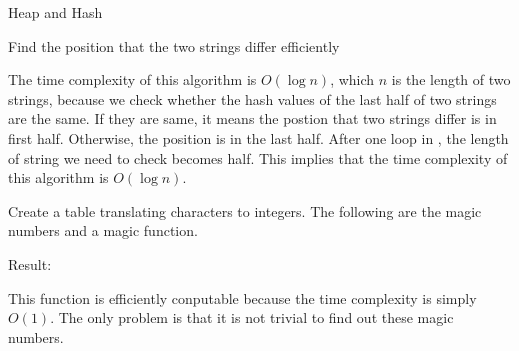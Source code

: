 \begin{homeworkProblem}{Heap and Hash}
    \begin{algorithm}[]
        \begin{algorithmic}[1]
                    \Else
                    \EndIf
                \EndWhile
            \EndFunction{}
        \end{algorithmic}
        \caption{Find the position that the two strings differ efficiently}
    \end{algorithm}
    The time complexity of this algorithm is $O(\log n)$, which $n$ is the length
    of two strings, because we check whether the hash values of the last half of 
    two strings are the same. If they are same, it means the postion that two 
    strings differ is in first half. Otherwise, the position is in the last half.
    After one loop in , the length of string we need to check becomes
    half. This implies that the time complexity of this algorithm is $O(\log n)$.



        Create a table translating characters to integers. The following are
        the magic numbers and a magic function.
        

        Result:
        

        This function is efficiently conputable because the time complexity is 
        simply $O(1)$. The only problem is that it is not trivial to find out 
        these magic numbers. 


            

\end{homeworkProblem}

